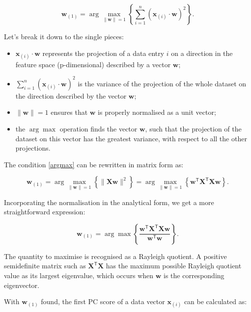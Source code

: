 \begin{equation}
\mathbf{w}_{(1)} = \arg \max_{\|\mathbf{w}\| = 1} \left\{ \sum_{i=1}^{n} \left( \mathbf{x}_{(i)} \cdot \mathbf{w} \right)^2 \right\}.\label{argmax}
\end{equation}

Let's break it down to the single pieces: 
\begin{itemize}
    \item $\mathbf{x}_{(i)} \cdot \mathbf{w}$ represents the projection of a data entry $i$ on a direction in the feature space (p-dimensional) described by a vector $ \mathbf{w}$;
    \item $ \sum_{i=1}^{n} \left( \mathbf{x}_{(i)} \cdot \mathbf{w} \right)^2$ is the variance of the projection of the whole dataset on the direction described by the vector $ \mathbf{w}$;
    \item $\|\mathbf{w}\| = 1$ ensures that $\mathbf{w}$ is properly normalised as a unit vector;
    \item the $\arg \max$ operation finds the vector $\mathbf{w}$, such that the projection of the dataset on this vector has the greatest variance, with respect to all the other projections.
\end{itemize}

The condition \ref{argmax} can be rewritten in matrix form as:

\begin{equation}
\mathbf{w}_{(1)} = \arg \max_{\|\mathbf{w}\| = 1} \left\{ \|\mathbf{Xw}\|^2 \right\} = \arg \max_{\|\mathbf{w}\| = 1} \left\{ \mathbf{w}^{\mathsf{T}} \mathbf{X}^{\mathsf{T}} \mathbf{Xw} \right\}.
\end{equation}

Incorporating the normalisation in the analytical form, we get a more straightforward expression:

\begin{equation}
\mathbf{w}_{(1)} = \arg \max \left\{ \frac{\mathbf{w}^{\mathsf{T}} \mathbf{X}^{\mathsf{T}} \mathbf{Xw}}{\mathbf{w}^{\mathsf{T}} \mathbf{w}} \right\}.\label{first_weight}
\end{equation}

The quantity to maximise is recognised as a Rayleigh quotient\cite{horn13}. A positive semidefinite matrix such as $\mathbf{X}^{\mathsf{T}} \mathbf{X}$ has the maximum possible Rayleigh quotient value as its largest eigenvalue, which occurs when $\mathbf{w}$ is the corresponding eigenvector\cite{parlett1998symmetric}.


With $\mathbf{w}_{(1)}$ found, the first PC score of a data vector $\mathbf{x}_{(i)}$ can be calculated as:

